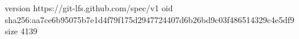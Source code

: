 version https://git-lfs.github.com/spec/v1
oid sha256:aa7ce6b95075b7e1d4f79f175d2947724407d6b26bd9c03f486514329c4e5df9
size 4139
